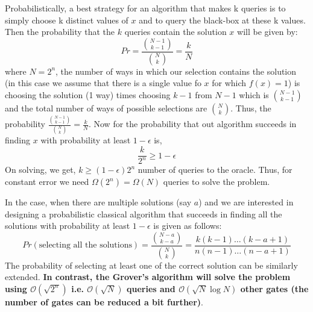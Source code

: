 Probabilistically, a best strategy for an algorithm that makes k queries is to simply choose k distinct values of $x$ and to query the black-box at these k values. Then the probability that the $k$ queries contain the solution $x$ will be given by:
\[
Pr= \frac{\binom{N-1}{k-1}}{\binom{N}{k}}=\frac{k}{N}
\]
where $N=2^n$, the number of ways in which our selection contains the solution (in this case we assume that there is a single value fo $x$ for which $f(x)=1$) is choosing the solution (1 way) times choosing $k-1$ from $N-1$ which is $\binom{N-1}{k-1}$ and the total number of ways of possible selections are $\binom{N}{k}$. Thus, the probability $\frac{\binom{N-1}{k-1}}{\binom{N}{k}}=\frac{k}{N}$. Now for the probability that out algorithm succeeds in finding $x$ with probability at least $1-\epsilon$ is,
\[
\frac{k}{2^n} \geq 1-\epsilon
\]
On solving, we get, $k\geq (1-\epsilon)2^n$ number of queries to the oracle. Thus, for constant error we need $\Omega(2^n)=\Omega(N)$ queries to solve the problem.

In the case, when there are multiple solutions (say $a$) and we are interested in designing a probabilistic classical algorithm that succeeds in finding all the solutions with probability at least $1-\epsilon$ is given as follows:
\[
Pr(\text{selecting all the solutions}) = \frac{\binom{N-a}{k-a}}{\binom{N}{k}} = \frac{k(k-1)\ldots (k-a+1)}{n(n-1)\ldots (n-a+1)}
\]
The probability of selecting at least one of the correct solution can be similarly extended.
\textbf{In contrast, the Grover's algorithm will solve the problem using $\mathcal{O}(\sqrt{2^n})$ i.e. $\mathcal{O}(\sqrt{N})$ queries and $\mathcal{O}(\sqrt{N}\log N)$ other gates (the number of gates can be reduced a bit further)}.

